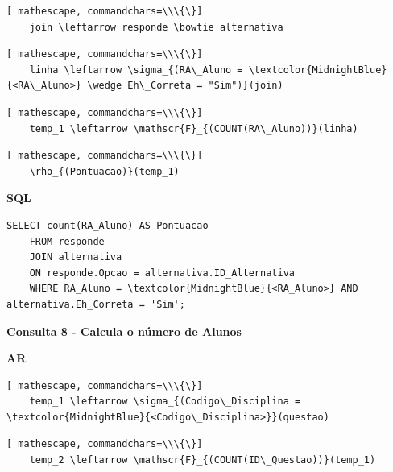 \documentclass[12pt,a4paper]{article}
\begin{document}
\begin{Verbatim}[ mathescape, commandchars=\\\{\}]
    join \leftarrow responde \bowtie alternativa
\end{Verbatim}

\begin{Verbatim}[ mathescape, commandchars=\\\{\}]
    linha \leftarrow \sigma_{(RA\_Aluno = \textcolor{MidnightBlue}{<RA\_Aluno>} \wedge Eh\_Correta = "Sim")}(join)
\end{Verbatim}

\begin{Verbatim}[ mathescape, commandchars=\\\{\}]
    temp_1 \leftarrow \mathscr{F}_{(COUNT(RA\_Aluno))}(linha)
\end{Verbatim}

\begin{Verbatim}[ mathescape, commandchars=\\\{\}]
    \rho_{(Pontuacao)}(temp_1)
\end{Verbatim}

\begin{center}
    \textbf{SQL}
\end{center}
\begin{Verbatim}[commandchars=\\\{\}]
    SELECT count(RA_Aluno) AS Pontuacao
    FROM responde 
    JOIN alternativa 
    ON responde.Opcao = alternativa.ID_Alternativa 
    WHERE RA_Aluno = \textcolor{MidnightBlue}{<RA_Aluno>} AND alternativa.Eh_Correta = 'Sim';
\end{Verbatim}

\vspace{0.5cm}
\begin{center}
    \textbf{Consulta 8 - Calcula o número de Alunos  }
\end{center}
\begin{center}
    \textbf{AR}
\end{center}

\begin{Verbatim}[ mathescape, commandchars=\\\{\}]
    temp_1 \leftarrow \sigma_{(Codigo\_Disciplina = \textcolor{MidnightBlue}{<Codigo\_Disciplina>}}(questao)
\end{Verbatim}

\begin{Verbatim}[ mathescape, commandchars=\\\{\}]
    temp_2 \leftarrow \mathscr{F}_{(COUNT(ID\_Questao))}(temp_1)
\end{Verbatim}
\end{document}
